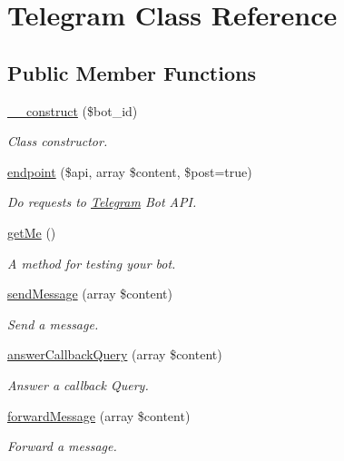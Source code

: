 \hypertarget{class_telegram}{}\section{Telegram Class Reference}
\label{class_telegram}
\subsection*{Public Member Functions}
\begin{DoxyCompactItemize}
\item 
\hyperlink{class_telegram_a340324043882a7c5e432ba045425f49a}{\+\_\+\+\_\+construct} (\$bot\+\_\+id)
\begin{DoxyCompactList}\small\item\em Class constructor. \end{DoxyCompactList}\item 
\hyperlink{class_telegram_a9241a37baf9b641df49a377c34bbdd59}{endpoint} (\$api, array \$content, \$post=true)
\begin{DoxyCompactList}\small\item\em Do requests to \hyperlink{class_telegram}{Telegram} Bot A\+P\+I. \end{DoxyCompactList}\item 
\hyperlink{class_telegram_a6bc057a9b0c03f8147a4294936b2494b}{get\+Me} ()
\begin{DoxyCompactList}\small\item\em A method for testing your bot. \end{DoxyCompactList}\item 
\hyperlink{class_telegram_af1369d6caab77f71a051ab73fa642a3f}{send\+Message} (array \$content)
\begin{DoxyCompactList}\small\item\em Send a message. \end{DoxyCompactList}\item 
\hyperlink{class_telegram_a55fa1d6bbcca385e333b402894e8ca37}{answer\+Callback\+Query} (array \$content)
\begin{DoxyCompactList}\small\item\em Answer a callback Query. \end{DoxyCompactList}\item 
\hyperlink{class_telegram_aebf3d567e947a457971c1501be7fc1fe}{forward\+Message} (array \$content)
\begin{DoxyCompactList}\small\item\em Forward a message. \end{DoxyCompactList}\item 

\end{DoxyCompactItemize}
